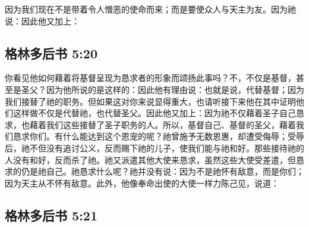\par

因为我们现在不是带着令人憎恶的使命而来；而是要使众人与天主为友。因为祂说：因此他又加上：\par


\subsection{格林多后书 5:20}

\par

你看见他如何藉着将基督呈现为恳求者的形象而颂扬此事吗？不，不仅是基督，甚至是圣父？因为他所说的是这样的：因此他有理由说：也就是说，代替基督；因为我们接替了祂的职务。但如果这对你来说显得重大，也请听接下来他在其中证明他们这样做不仅是代替祂，也代替圣父。因此他又加上：因为祂不仅藉着圣子自己恳求，也藉着我们这些接替了圣子职务的人。所以，基督自己、基督的圣父，藉着我们恳求你们。有什么能达到这个恩宠的呢？祂曾施予无数恩惠，却遭受侮辱；受辱后，祂不但没有追讨公义，反而赐下祂的儿子，使我们能与祂和好。那些接待祂的人没有和好，反而杀了祂。祂又派遣其他大使来恳求，虽然这些大使受差遣，但恳求的仍是祂自己。祂恳求什么呢？祂并没有说：因为不是祂怀有敌意，而是你们；因为天主从不怀有敌意。此外，他像奉命出使的大使一样力陈己见，说道：\par


\subsection{格林多后书 5:21}

\par

